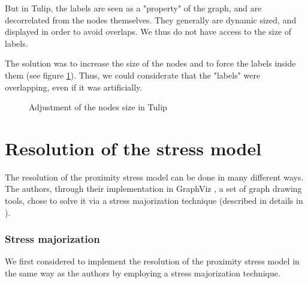 \documentclass[12pt]{report}
\begin{document}
But in Tulip, the labels are seen as a "property" of the graph, and are decorrelated from the nodes themselves. They generally are dynamic sized, and displayed in order to avoid overlaps. We thus do not have access to the size of labels.

The solution was to increase the size of the nodes and to force the labels inside them (see figure \ref{graphTulip}). Thus, we could considerate that the "labels" were overlapping, even if it was artificially.

\begin{figure}[h]
  \setlength\fboxsep{5pt}
  \setlength\fboxrule{0.5pt}
  \caption{Adjustment of the nodes size in Tulip}
  \label{graphTulip}
\end{figure}

\section{Resolution of the stress model}

The resolution of the proximity stress model can be done in many different ways. The authors, through their implementation in GraphViz \cite{Gansner02}, a set of graph drawing tools, chose to solve it via a stress majorization technique (described in details in \cite{Gansner05}). 

\subsubsection{Stress majorization}

We first considered to implement the resolution of the proximity stress model in the same way as the authors by employing a stress majorization technique.
\end{document}
